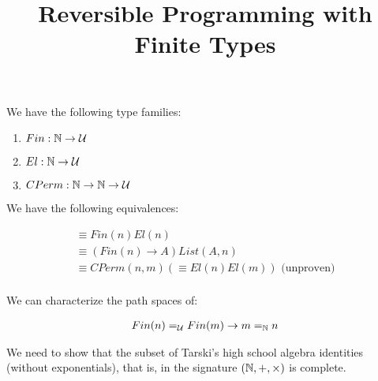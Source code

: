 \documentclass{article}
\title{Reversible Programming with Finite Types}
\author{}
\begin{document}
\maketitle

We have the following type families:

\begin{enumerate}
  \item $Fin : \mathbb{N} \rightarrow \mathcal{U}$
  \item $El : \mathbb{N} \rightarrow \mathcal{U}$
  \item $CPerm : \mathbb{N} \rightarrow \mathbb{N} \rightarrow \mathcal{U}$
\end{enumerate}

We have the following equivalences:

\begin{gather*}
  \equiv{Fin(n)}{El(n)} \\
  \equiv{(Fin(n) \to A)}{List(A, n)} \\
  \equiv{CPerm(n,m)}({\equiv{El(n)}{El(m)}}) \text{ (unproven)} \\
\end{gather*}

We can characterize the path spaces of:

\begin{gather*}
  {Fin(n)}=_{\mathcal{U}}{Fin(m)} \rightarrow {m}=_{\mathbb{N}}{n}
\end{gather*}

We need to show that the subset of Tarski's high school algebra identities
(without exponentials), that is, in the signature $(\mathbb{N}, +, \times)$ is
complete.
\end{document}
